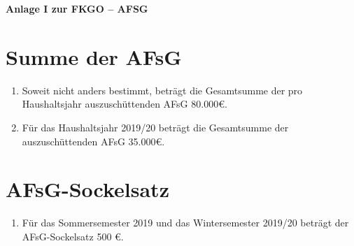\documentclass{article}
\begin{document}
\begin{center}
    \huge \textbf{Anlage I zur FKGO -- AFSG}
\end{center}


\section{Summe der AFsG}
\begin{enumerate}[(1)]
    \item Soweit nicht anders bestimmt, beträgt die Gesamtsumme der pro Haushaltsjahr auszuschüttenden AFsG 80.000€.
    \item Für das Haushaltsjahr 2019/20 beträgt die Gesamtsumme der auszuschüttenden AFsG 35.000€.
\end{enumerate}

\section{AFsG-Sockelsatz}
\begin{enumerate}[(1)]
    \item Für das Sommersemester 2019 und das Wintersemester 2019/20 beträgt der AFsG-Sockelsatz 500 €.
\end{enumerate}
\end{document}

